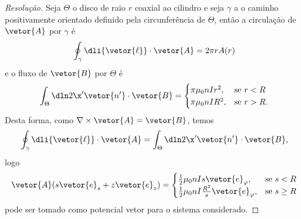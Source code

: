 \begin{proof}[Resolução]
    Seja \(\Theta\) o disco de raio \(r\) coaxial ao cilindro e seja \(\gamma\) a o caminho positivamente orientado definido pela circunferência de \(\Theta\), então a circulação de \(\vetor{A}\) por \(\gamma\) é
    \begin{equation*}
        \oint_{\gamma} \dli{\vetor{\ell}}\cdot\vetor{A} = 2\pi r A(r)
    \end{equation*}
    e o fluxo de \(\vetor{B}\) por \(\Theta\) é
    \begin{equation*}
        \int_{\Theta} \dln2{\x'}\vetor{n'}\cdot\vetor{B} = \begin{cases}
            \pi \mu_0 n I r^2,&\text{se }r < R\\
            \pi \mu_0 n I R^2, &\text{se }r > R.
        \end{cases}
    \end{equation*}
    Desta forma, como \(\nabla \times \vetor{A} = \vetor{B}\), temos
    \begin{equation*}
        \oint_{\gamma}\dli{\vetor{\ell}}\cdot \vetor{A} = \int_{\Theta} \dln2{\x'} \vetor{n'}\cdot\vetor{B},
    \end{equation*}
    logo
    \begin{equation*}
        \vetor{A}(s\vetor{e}_s + z \vetor{e}_z) = \begin{cases}
            \frac12 \mu_0nI s \vetor{e}_\varphi,&\text{se }s < R\\
            \frac12 \mu_0 nI \frac{R^2}{s}\vetor{e}_\varphi,&\text{se }s \geq R
        \end{cases}
    \end{equation*}
    pode ser tomado como potencial vetor para o sistema considerado.
\end{proof}
